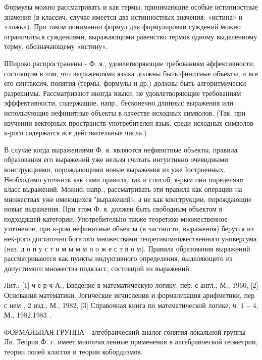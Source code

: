 \documentclass[10pt]{article}
\begin{document}
Формулы можно рассматривать и как термы, принимающие особые истинностные значения (в классич. случае имеется два истинностных значения: «истина» и «ложь»). При таком понимании формул для формулировки суждений можно ограничиться суждениями, выражающими равенство термов одному выделенному терму, обозначающему «истину».



Шlироко распространены - Ф. я., удовлетворяющие требованиям әффективности, состоящим в том, что выражениями языка должны быть финитные объекты, и все его синтаксич. понятия (термы, формулы и др.) должны быть алгоритмически разрешимы. Рассматривают иногда языки, не удовлетворяющие требованиям эфффективности, содержащие, напр., бесконечно длинныс выражения или использующие нефинитные объекты в качестве исходных символов. (Так, при изучении векторных пространств употребителен язык, среди исходных символов к-рого содержатся все действительные числа.)



В случае когда выражениями Ф. я. являются нефинитные объекты, правила образования его выражений уже нельзя считать интуитивно очевидными конструкциями, порождающими новые выражения из уже Іостроенных. Необходимо уточнить как сами правила, так и способ, к-рым они определяют класс выражений. Можно, напр., рассматривать эти правила как операции на множествах уже имеющихся "выражений», а не как конструкции, порождающие новые выражения. При этом Ф. я. должен быть свободным объектом в подходящей категории. Употребительно также теоретико-множественное уточнение, при к-ром нефинитные объекты (в частности, выражения) берутся из нек-рого достаточно богатого множествами теоретикомножественного универсума (наз. д о п у с т и м ы м м н о ж е с т в о м). Правила образования выражөний рассматриваются как пункты индүктивного определения, выделяющего из допустимого множества подкласс, состоящий из выражений.



Лит.: [1] ч е р ч А., Введение в математическую логику, пер. с англ., М., 1960, [2] Основания математики. Јогические исчисления и формализация арифметики, пер с нем , 2 изд., М., 1982, [3] Справочная книга по математической логике, ч. $1-4$, М., 1982,1983 .



ФОРМАЛЬНАЯ ГРУППА - алгебраический аналог гонятия локальной группы Ли. Теория Ф. г. имеет многочисленные применения в алгебраической геометрии, теории полей классов и теории кобордизмов.
\end{document}
